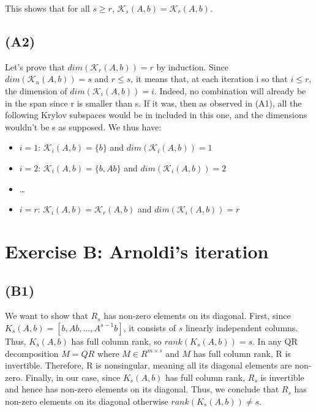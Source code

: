 \documentclass{article}
\begin{document}
This shows that for all $s\geq r$, $\mathcal{K}_{s}(A,b) = \mathcal{K}_{r}(A,b) $.


\subsection*{(A2)}
Let's prove that $ dim( \mathcal{K}_r (A,b)) = r$ by induction. Since $ dim( \mathcal{K}_n (A,b)) = s$ and $r \leq s$, it means that, 
at each iteration i so that $i \leq r$, the dimension of  $ dim( \mathcal{K}_i (A,b)) = i$. Indeed, no combination will already be in the span
since r is smaller than s. If it was, then as observed in (A1), all the following Krylov subspaces would be in included in this one, and the
dimensions wouldn't be s as supposed. 
We thus have:
\begin{itemize}
    \item $i = 1$: $ \mathcal{K}_i (A,b) = \{b\}$ and $dim( \mathcal{K}_i (A,b)) = 1$
    \item $i = 2$: $ \mathcal{K}_i (A,b) = \{b, Ab\}$ and $dim( \mathcal{K}_i (A,b)) = 2$
    \item \dots
    \item $i = r$: $ \mathcal{K}_i (A,b) = \mathcal{K}_r (A,b) $ and $dim( \mathcal{K}_i (A,b)) = r$
\end{itemize}

\section{Exercise B: Arnoldi’s iteration}
\subsection*{(B1)}
We want to show that $ R_s $ has non-zero elements on its diagonal.
First, since $ K_s(A, b) = [b, Ab, \dots, A^{s-1}b] $, it consists of $ s $ linearly independent columns. Thus, $ K_s(A, b) $ has full column rank,
 so $ rank(K_s(A, b)) = s $.
In any QR decomposition $ M = QR$ where $ M \in R^{m \times s} $ and $ M $ has full column rank, R is invertible. 
Therefore, R is nonsingular, meaning all its diagonal elements are non-zero.
Finally, in our case, since $ K_s(A, b) $ has full column rank, $R_s $ is invertible and hence has non-zero elements on its diagonal.
Thus, we conclude that $ R_s $ has non-zero elements on its diagonal otherwise $rank(K_s (A,b)) \neq s$.
\end{document}
